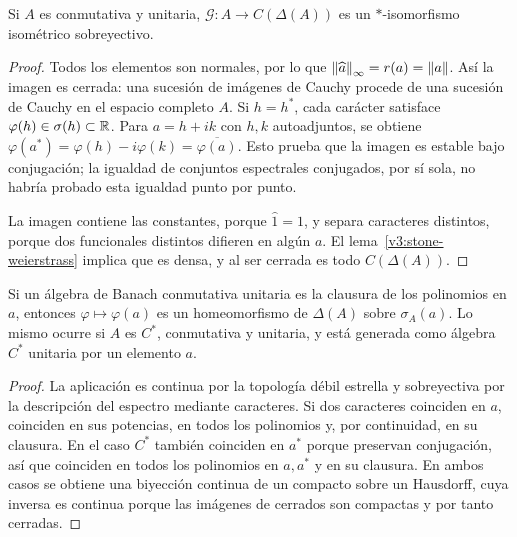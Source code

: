 \begin{teorema}\label{v3:gelfand-cstar}
Si $A$ es conmutativa y unitaria, $\mathcal G:A\to C(\Delta(A))$ es un $*$-isomorfismo isométrico sobreyectivo.
\end{teorema}
\begin{proof}
Todos los elementos son normales, por lo que $\left\lVert\widehat a\right\rVert_\infty=r(a)=\left\lVert a\right\rVert$. Así la imagen es cerrada: una sucesión de imágenes de Cauchy procede de una sucesión de Cauchy en el espacio completo $A$. Si $h=h^*$, cada carácter satisface $\varphi(h)\in\sigma(h)\subset\mathbb R$. Para $a=h+ik$ con $h,k$ autoadjuntos, se obtiene
$\varphi(a^*)=\varphi(h)-i\varphi(k)=\overline{\varphi(a)}$. Esto prueba que la imagen es estable bajo conjugación; la igualdad de conjuntos espectrales conjugados, por sí sola, no habría probado esta igualdad punto por punto.

La imagen contiene las constantes, porque $\widehat1=1$, y separa caracteres distintos, porque dos funcionales distintos difieren en algún $a$. El lema~\ref{v3:stone-weierstrass} implica que es densa, y al ser cerrada es todo $C(\Delta(A))$.
\end{proof}

\begin{proposicion}\label{v3:generador-espectro}
Si un álgebra de Banach conmutativa unitaria es la clausura de los polinomios en $a$, entonces $\varphi\mapsto\varphi(a)$ es un homeomorfismo de $\Delta(A)$ sobre $\sigma_A(a)$. Lo mismo ocurre si $A$ es $C^*$, conmutativa y unitaria, y está generada como álgebra $C^*$ unitaria por un elemento $a$.
\end{proposicion}
\begin{proof}
La aplicación es continua por la topología débil estrella y sobreyectiva por la descripción del espectro mediante caracteres. Si dos caracteres coinciden en $a$, coinciden en sus potencias, en todos los polinomios y, por continuidad, en su clausura. En el caso $C^*$ también coinciden en $a^*$ porque preservan conjugación, así que coinciden en todos los polinomios en $a,a^*$ y en su clausura. En ambos casos se obtiene una biyección continua de un compacto sobre un Hausdorff, cuya inversa es continua porque las imágenes de cerrados son compactas y por tanto cerradas.
\end{proof}

